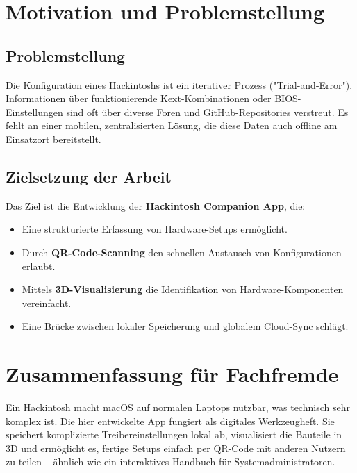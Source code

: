 \section{Motivation und Problemstellung}
\subsection{Problemstellung}
Die Konfiguration eines Hackintoshs ist ein iterativer Prozess ("Trial-and-Error"). Informationen über funktionierende Kext-Kombinationen oder BIOS-Einstellungen sind oft über diverse Foren und GitHub-Repositories verstreut. Es fehlt an einer mobilen, zentralisierten Lösung, die diese Daten auch offline am Einsatzort bereitstellt.

\subsection{Zielsetzung der Arbeit}
Das Ziel ist die Entwicklung der \textbf{Hackintosh Companion App}, die:
\begin{itemize}
    \item Eine strukturierte Erfassung von Hardware-Setups ermöglicht.
    \item Durch \textbf{QR-Code-Scanning} den schnellen Austausch von Konfigurationen erlaubt.
    \item Mittels \textbf{3D-Visualisierung} die Identifikation von Hardware-Komponenten vereinfacht.
    \item Eine Brücke zwischen lokaler Speicherung und globalem Cloud-Sync schlägt.
\end{itemize}

\section{Zusammenfassung für Fachfremde}
Ein Hackintosh macht macOS auf normalen Laptops nutzbar, was technisch sehr komplex ist. Die hier entwickelte App fungiert als digitales Werkzeugheft. Sie speichert komplizierte Treibereinstellungen lokal ab, visualisiert die Bauteile in 3D und ermöglicht es, fertige Setups einfach per QR-Code mit anderen Nutzern zu teilen – ähnlich wie ein interaktives Handbuch für Systemadministratoren.